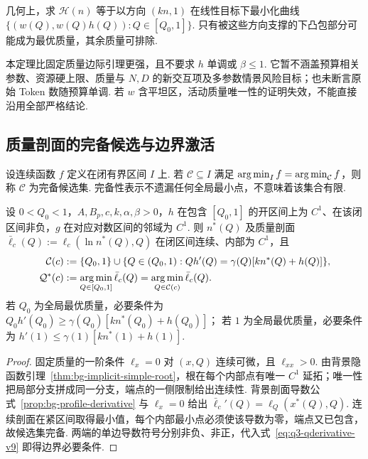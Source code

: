 几何上，求 $\mathscr H(n)$ 等于以方向 $(kn,1)$ 在线性目标下最小化曲线
$\{(w(Q),w(Q)h(Q)):Q\in[Q_0,1]\}$. 只有被这些方向支撑的下凸包部分可能成为最优质量，其余质量可排除. %

本定理比固定质量边际引理更强，且不要求 $h$ 单调或 $\beta\le1$. 它暂不涵盖预算相关参数、资源硬上限、质量与 $N,D$ 的新交互项及多参数情景风险目标；也未断言原始 Token 数随预算单调. 若 $w$ 含平坦区，活动质量唯一性的证明失效，不能直接沿用全部严格结论. 

\subsection{质量剖面的完备候选与边界激活}

\begin{definition}[剖面目标的完备候选集]\label{def:q3-complete-candidate-v29}
设连续函数 $f$ 定义在闭有界区间 $I$ 上. 若 $\mathcal C\subseteq I$ 满足 $\operatorname*{arg\,min}_I f=\operatorname*{arg\,min}_{\mathcal C}f$，则称 $\mathcal C$ 为完备候选集. 完备性表示不遗漏任何全局最小点，不意味着该集合有限. 
\end{definition}

\begin{theorem}[质量剖面的完备候选与边界激活]\label{thm:q3-active-transition}
设 $0<Q_0<1$，$A,B_p,c,k,\alpha,\beta>0$，$h$ 在包含 $[Q_0,1]$ 的开区间上为 $C^1$、在该闭区间非负，$g$ 在对应对数区间的邻域为 $C^1$. 则 $n^*(Q)$ 及质量剖面 $\bar\ell_c(Q):=\ell_c(\ln n^*(Q),Q)$ 在闭区间连续、内部为 $C^1$，且
\begin{subequations}\label{eq:q3-candidate-set-v25}
    \begin{align}
\mathcal C(c)&:=\{Q_0,1\}\cup
\{Q\in(Q_0,1):Qh'(Q)=\gamma(Q)[kn^*(Q)+h(Q)]\},\\
\mathcal Q^*(c)&:=\operatorname*{arg\,min}_{Q\in[Q_0,1]}\bar\ell_c(Q)
=\operatorname*{arg\,min}_{Q\in\mathcal C(c)}\bar\ell_c(Q).
\end{align}
\end{subequations}
若 $Q_0$ 为全局最优质量，必要条件为 $Q_0h'(Q_0)\ge\gamma(Q_0)[kn^*(Q_0)+h(Q_0)]$；
若 $1$ 为全局最优质量，必要条件为 $h'(1)\le\gamma(1)[kn^*(1)+h(1)]$. 
\end{theorem}
\begin{proof}
固定质量的一阶条件 $\ell_x=0$ 对 $(x,Q)$ 连续可微，且 $\ell_{xx}>0$. 由背景隐函数引理~\ref{thm:bg-implicit-simple-root}，根在每个内部点有唯一 $C^1$ 延拓；唯一性把局部分支拼成同一分支，端点的一侧限制给出连续性. 背景剖面导数公式~\ref{prop:bg-profile-derivative} 与 $\ell_x=0$ 给出 $\bar\ell_c'(Q)=\ell_Q(x^*(Q),Q)$. 连续剖面在紧区间取得最小值，每个内部最小点必须使该导数为零，端点又已包含，故候选集完备. 两端的单边导数符号分别非负、非正，代入式~\eqref{eq:q3-qderivative-v9} 即得边界必要条件. 
\end{proof}

